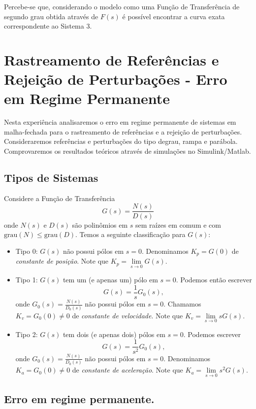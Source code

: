 \documentclass[
]{book}
\providecommand{\tightlist}{%
  \setlength{\itemsep}{0pt}\setlength{\parskip}{0pt}}
\theoremstyle{definition}
\theoremstyle{definition}
\theoremstyle{definition}
\theoremstyle{remark}
\begin{document}
Percebe-se que, considerando o modelo como uma Função de Transferência de segundo grau obtida através de \(F(s)\) é possível encontrar a curva exata correspondente ao Sistema 3.

\hypertarget{lab4}{%
\chapter{Rastreamento de Referências e Rejeição de Perturbações - Erro em Regime Permanente}\label{lab4}}

Nesta experiência analisaremos o erro em regime permanente de sistemas em malha-fechada para o rastreamento de referências e a rejeição de perturbações. Consideraremos referências e perturbações do tipo degrau, rampa e parábola. Comprovaremos os resultados teóricos através de simulações no Simulink/Matlab.

\hypertarget{tipos-de-sistemas}{%
\section{Tipos de Sistemas}\label{tipos-de-sistemas}}

Considere a Função de Transferência
\[
G(s) = \frac {N(s)}{D(s)}
\]
onde \(N(s)\) e \(D(s)\) são polinômios em \(s\) sem raízes em comum e com \(\text{grau}(N) \leq \text{grau}(D)\). Temos a seguinte classificação para \(G(s)\):

\begin{itemize}
\tightlist
\item
  Tipo 0: \(G(s)\) não possui pólos em \(s=0\). Denominamos \(K_p = G(0)\) de \emph{constante de posição}. Note que \(K_p = \lim\limits_{s \to 0} G(s)\).
\item
  Tipo 1: \(G(s)\) tem um (e apenas um) pólo em \(s=0\). Podemos então escrever \[G(s) = \frac {1}{s}G_0(s),\] onde \(G_0(s) = \frac {N(s)}{D_0(s)}\) não possui pólos em \(s=0\). Chamamos \(K_v= G_0(0) \neq 0\) de \emph{constante de velocidade}. Note que \(K_v = \lim\limits_{s \to 0} sG(s)\).
\item
  Tipo 2: \(G(s)\) tem dois (e apenas dois) pólos em \(s=0\). Podemos escrever \[G(s) = \frac {1}{s^2}G_0(s),\] onde \(G_0(s) = \frac {N(s)}{D_0(s)}\) não possui pólos em \(s=0\). Denominamos \(K_a = G_0(0) \neq 0\) de \emph{constante de aceleração}. Note que \(K_a =\lim\limits_{s \to 0} s^2G(s)\).
\end{itemize}

\hypertarget{erro-em-regime-permanente.}{%
\section{Erro em regime permanente.}\label{erro-em-regime-permanente.}}
\end{document}
